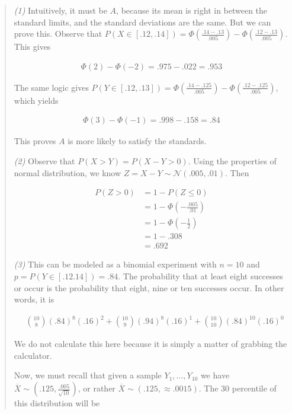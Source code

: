 \documentclass[a4paper, 12pt]{article}
\begin{document}
\small
\begin{quote}

\textit{(1)} Intuitively, it must be $A$, because its mean is right in between
the standard limits, and the standard deviations are the same. But we can prove
this. Observe that $P(X \in [.12, .14]) = \Phi \left( \frac{.14 - .13}{.005}
\right) - \Phi\left( \frac{.12 - .13}{.005} \right) $. This gives 

\begin{align*}
    \Phi(2) - \Phi(-2) = .975 -.022 = .953
\end{align*}

The same logic gives $P(Y \in [.12, .13]) = \Phi\left( \frac{.14 - .125}{.005}
    \right) -
\Phi\left( \frac{.12 - .125}{.005} \right) $, which yields

\begin{align*}
    \Phi(3) - \Phi(-1) = .998 - .158 = .84
\end{align*}

This proves $A$ is more likely to satisfy the standards.

\textit{(2)} Observe that $P(X > Y) = P(X - Y > 0)$. Using the properties of
normal distribution, we know $Z = X - Y \sim \mathcal{N}(.005, .01)$. Then 

\begin{align*}
    P(Z > 0) &= 1 - P(Z \leq 0)  \\ 
             &= 1 - \Phi\left( -\frac{.005}{.01} \right) \\ 
             &= 1 - \Phi\left(-\frac{1}{2}\right) \\ 
             &= 1 - .308 \\ 
             &= .692
\end{align*}

\textit{(3)} This can be modeled as a binomial experiment with $n = 10$ and $p =
P(Y \in [.12. 14]) = .84$. The probability that at least eight successes or
occur is the probability that eight, nine or ten successes occur. In other
words, it is 

\begin{align*}
    &\binom{10}{8}(.84)^{8}(.16)^2 + 
    \binom{10}{9}(.94)^{8}(.16)^1 + 
    \binom{10}{10}(.84)^{10}(.16)^0 
\end{align*}

We do not calculate this here because it is simply a matter of grabbing the
calculator.

Now, we must recall that given a sample $Y_1, \ldots, Y_{10}$ we have
$\overline{X} \sim (.125, \frac{.005}{\sqrt{10} })$, or rather $\overline{X}
\sim (.125, \approx .0015)$. The $30$ percentile of this distribution will be 


\end{quote}
\end{document}
